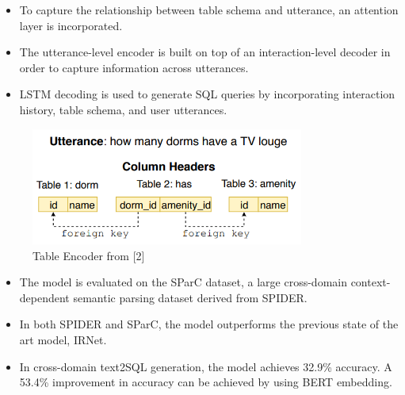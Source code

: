 \begin{itemize}
    \item To capture the relationship between table schema and utterance, an attention layer is incorporated.
    \item The utterance-level encoder is built on top of an interaction-level decoder in order to capture information across utterances.
    \item LSTM decoding is used to generate SQL queries by incorporating interaction history, table schema, and user utterances.
\end{itemize}

\begin{figure}[htb]
    \centering
    \includegraphics[width=0.8\textwidth]{pics/EditSQL/example.png}
    \caption{Table Encoder from [2]}
    \label{fig:EditSQL_example}
\end{figure}

\begin{itemize}
    \item The model is evaluated on the SParC dataset, a large cross-domain context-dependent semantic parsing dataset derived from SPIDER.
    \item In both SPIDER and SParC, the model outperforms the previous state of the art model, IRNet.
    \item In cross-domain text2SQL generation, the model achieves 32.9\% accuracy. A 53.4\% improvement in accuracy can be achieved by using BERT embedding.
\end{itemize}
